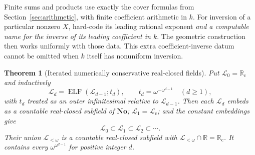 \documentclass[11pt,letterpaper]{article}
\numberwithin{equation}{section}
\newtheorem{theorem}{Theorem}[section]
\theoremstyle{definition}
\theoremstyle{remark}
\newcommand{\No}{\mathbf{No}}
\newcommand{\Rc}{\mathbb R_{\mathrm c}}
\newcommand{\Lc}{\mathcal L_{\mathrm c}}
\newcommand{\R}{\mathbb R}
\begin{document}
Finite sums and products use exactly the cover formulas from
Section~\ref{sec:arithmetic}, with finite coefficient arithmetic in $k$.
For inversion of a particular nonzero $X$, hard-code its leading rational
exponent \emph{and a computable name for the inverse of its leading
coefficient in $k$}. The geometric construction then works uniformly with
those data. This extra coefficient-inverse datum cannot be omitted when
$k$ itself has nonuniform inversion.

\begin{theorem}[Iterated numerically conservative real-closed fields]
\label{thm:iterated}
Put $\mathcal L_0=\Rc$ and inductively
\[
 \mathcal L_d=\operatorname{ELF}(\mathcal L_{d-1};t_d),\qquad
 t_d=\omega^{-\omega^{d-1}}\quad(d\ge1),
\]
with $t_d$ treated as an outer infinitesimal relative to $\mathcal L_{d-1}$.
Then each $\mathcal L_d$ embeds as a countable real-closed subfield of $\No$;
$\mathcal L_1=\Lc$; and the constant embeddings give
\[
 \mathcal L_0\subset \mathcal L_1\subset \mathcal L_2\subset\cdots.
\]
Their union $\mathcal L_{<\omega}$ is a countable real-closed subfield with
$\mathcal L_{<\omega}\cap\R=\Rc$. It contains every
$\omega^{\omega^{d-1}}$ for positive integer $d$.
\end{theorem}
\end{document}

